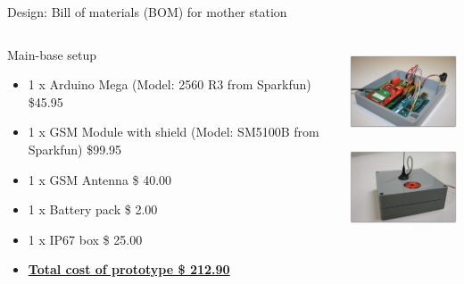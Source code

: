 \documentclass{beamer}
\begin{document}
\begin{frame}{Design: Bill of materials (BOM) for mother station}
\begin{columns}[T]
	\begin{column}[T]{6cm}
		Main-base setup
		\begin{itemize} \small
		\item 1 x Arduino Mega (Model: 2560 R3 from Sparkfun) \$45.95
		\item 1 x GSM Module with shield  (Model: SM5100B from Sparkfun) \$99.95
		\item 1 x GSM Antenna \$ 40.00
		\item 1 x Battery pack \$ 2.00
		\item 1 x IP67 box \$ 25.00
		\item \textbf{\underline{Total cost of prototype \$ 212.90}} 
		\end{itemize}
	\end{column}
		\begin{column}[T]{4cm}
		\includegraphics[height=2.7cm]{graphics/Field_pictures/Main_Open.JPG}\\
		\includegraphics[height=2.7cm]{graphics/Field_pictures/Main_Close.JPG}
		\end{column}
\end{columns}
\end{frame}
\end{document}
